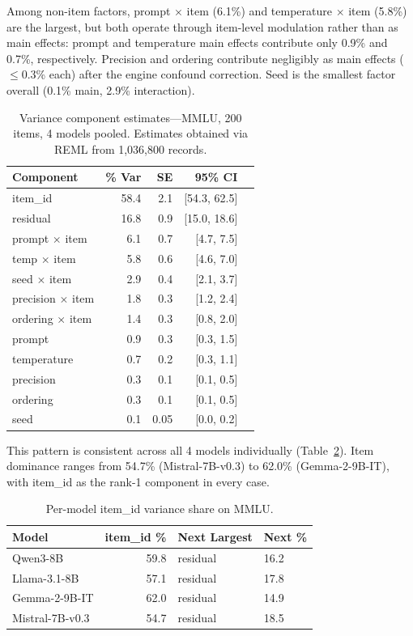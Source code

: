 \documentclass[letterpaper,11pt]{article}
\begin{document}
Among non-item factors, prompt $\times$ item (6.1\%) and temperature $\times$ item (5.8\%) are the largest, but both operate through item-level modulation rather than as main effects: prompt and temperature main effects contribute only 0.9\% and 0.7\%, respectively.
Precision and ordering contribute negligibly as main effects ($\leq$0.3\% each) after the engine confound correction.
Seed is the smallest factor overall (0.1\% main, 2.9\% interaction).

\begin{table}[t]
\centering
\caption{Variance component estimates---MMLU, 200 items, 4 models pooled. Estimates obtained via REML from 1,036,800 records.}
\label{tab:variance_components}
\small
\begin{tabular}{lrrrr}
\toprule
Component & \% Var & SE & 95\% CI \\
\midrule
item\_id & 58.4 & 2.1 & [54.3, 62.5] \\
residual & 16.8 & 0.9 & [15.0, 18.6] \\
prompt $\times$ item & 6.1 & 0.7 & [4.7, 7.5] \\
temp $\times$ item & 5.8 & 0.6 & [4.6, 7.0] \\
seed $\times$ item & 2.9 & 0.4 & [2.1, 3.7] \\
precision $\times$ item & 1.8 & 0.3 & [1.2, 2.4] \\
ordering $\times$ item & 1.4 & 0.3 & [0.8, 2.0] \\
prompt & 0.9 & 0.3 & [0.3, 1.5] \\
temperature & 0.7 & 0.2 & [0.3, 1.1] \\
precision & 0.3 & 0.1 & [0.1, 0.5] \\
ordering & 0.3 & 0.1 & [0.1, 0.5] \\
seed & 0.1 & 0.05 & [0.0, 0.2] \\
\bottomrule
\end{tabular}
\end{table}

This pattern is consistent across all 4 models individually (Table~\ref{tab:per_model_item}).
Item dominance ranges from 54.7\% (Mistral-7B-v0.3) to 62.0\% (Gemma-2-9B-IT), with item\_id as the rank-1 component in every case.

\begin{table}[t]
\centering
\caption{Per-model item\_id variance share on MMLU.}
\label{tab:per_model_item}
\small
\begin{tabular}{lrll}
\toprule
Model & item\_id \% & Next Largest & Next \% \\
\midrule
Qwen3-8B & 59.8 & residual & 16.2 \\
Llama-3.1-8B & 57.1 & residual & 17.8 \\
Gemma-2-9B-IT & 62.0 & residual & 14.9 \\
Mistral-7B-v0.3 & 54.7 & residual & 18.5 \\
\bottomrule
\end{tabular}
\end{table}
\end{document}
